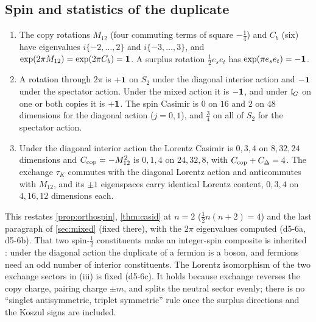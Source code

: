 \subsection{Spin and statistics of the duplicate}
\label{d5:sec:spin}

\begin{proposition}
\label{d5:prop:spin}
\begin{enumerate}[label=(\roman*),leftmargin=2.2em]
\item The copy rotations $M_{12}$ (four commuting terms of square $-\tfrac14$) and $C_b$ (six) have eigenvalues $i\{-2,\dots,2\}$ and $i\{-3,\dots,3\}$, and
$\exp(2\pi M_{12})=\exp(2\pi C_b)=\mathbf 1$. A surplus rotation $\tfrac12e_se_t$ has $\exp(\pi e_se_t)=-\mathbf 1$.
\item A rotation through $2\pi$ is $+\mathbf 1$ on $S_2$ under the diagonal interior action and $-\mathbf 1$ under the spectator action. Under the mixed action it
is $-\mathbf 1$, and under $\mathfrak l_G$ on one or both copies it is $+\mathbf 1$. The spin Casimir is $0$ on $16$ and $2$ on $48$ dimensions for the diagonal action
($j=0,1$), and $\tfrac34$ on all of $S_2$ for the spectator action.
\item Under the diagonal interior action the Lorentz Casimir is $0,3,4$ on $8,32,24$ dimensions and $C_{\rm cop}=-M_{12}^2$ is $0,1,4$ on $24,32,8$, with
$C_{\rm cop}+C_\Delta=4$. The exchange $\tau_K$ commutes with the diagonal Lorentz action and anticommutes with $M_{12}$, and its $\pm1$ eigenspaces
carry identical Lorentz content, $0,3,4$ on $4,16,12$ dimensions each.
\end{enumerate}
\end{proposition}

This restates \cref{prop:orthospin}, \cref{thm:casid} at $n=2$ ($\tfrac12n(n+2)=4$) and the last paragraph of \cref{sec:mixed} (fixed there),
with the $2\pi$ eigenvalues computed (d5-6a, d5-6b). That two spin-$\tfrac12$ constituents make an integer-spin composite is inherited
\cite{EhrenfestOppenheimer31}: under the diagonal action the duplicate of a fermion is a boson, and fermions need an odd number of interior
constituents. The Lorentz isomorphism of the two exchange sectors in (iii) is fixed (d5-6c). It holds because exchange reverses the copy
charge, pairing charge $\pm m$, and splits the neutral sector evenly; there is no ``singlet antisymmetric, triplet symmetric'' rule once the
surplus directions and the Koszul signs are included.

